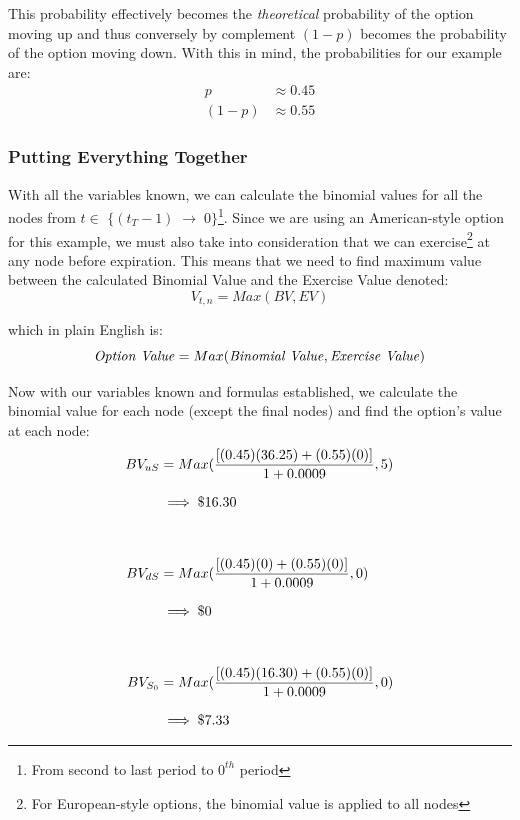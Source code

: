\documentclass[12pt, letterpaper]{article}\usepackage{float}
\begin{document}
\medskip

This probability effectively becomes the \textit{theoretical} probability of the option moving up and thus conversely by complement ${(1-p)}$ becomes the probability of the option moving down. With this in mind, the probabilities for our example are:
\begin{align*}
  p
  & \approx 0.45 \\
  (1-p)
  & \approx 0.55
\end{align*}

\pagebreak
\subsubsection*{Putting Everything Together}
With all the variables known, we can calculate the binomial values for all the nodes from ${t \in}$ ${\{(t_T - 1) \; \rightarrow \; 0\}}$\footnote{From second to last period to ${0^{th}}$ period}.
Since we are using an American-style option for this example, we must also take into consideration that we can exercise\footnote{For European-style options, the binomial value is applied to all nodes\cite{bopmwikipedia}} at any node before expiration.
This means that we need to find maximum value between the calculated Binomial Value and the Exercise Value denoted\cite{bopmwikipedia}:
\begin{equation*}
  V_{t,n} = Max({BV, EV})
\end{equation*}

\noindent which in plain English is:
\begin{equation*}
  \textrm{\textit{Option Value}} = Max(\textrm{\textit{Binomial Value}}, \textrm{\textit{Exercise Value}})
\end{equation*}

\bigskip

Now with our variables known and formulas established, we calculate the binomial value for each node (except the final nodes) and find the option's value at each node:
\begin{equation*}
  \setlength{\jot}{10pt}
  \begin{split}
    BV_{uS}
    & = Max(\frac{[(0.45)(36.25) + (0.55)(0)]}{1+0.0009}, 5) \\
    & \implies \$16.30 \\
    \\
    BV_{dS}
    & = Max(\frac{[(0.45)(0) + (0.55)(0)]}{1+0.0009}, 0) \\
    & \implies \$0 \\
    \\
    BV_{S_0}
    & = Max(\frac{[(0.45)(16.30) + (0.55)(0)]}{1+0.0009}, 0) \\
    & \implies \$7.33
  \end{split}
\end{equation*}
\end{document}
